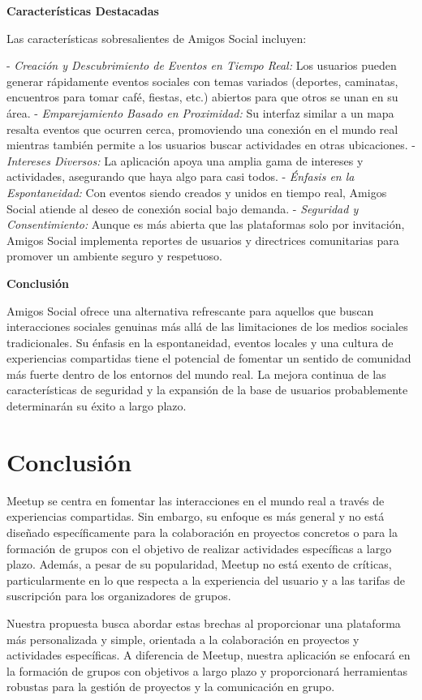 \textbf{Características Destacadas}

Las características sobresalientes de Amigos Social incluyen:

- \textit{Creación y Descubrimiento de Eventos en Tiempo Real:} Los usuarios pueden generar rápidamente eventos sociales con temas variados (deportes, caminatas, encuentros para tomar café, fiestas, etc.) abiertos para que otros se unan en su área.
- \textit{Emparejamiento Basado en Proximidad:} Su interfaz similar a un mapa resalta eventos que ocurren cerca, promoviendo una conexión en el mundo real mientras también permite a los usuarios buscar actividades en otras ubicaciones.
- \textit{Intereses Diversos:} La aplicación apoya una amplia gama de intereses y actividades, asegurando que haya algo para casi todos.
- \textit{Énfasis en la Espontaneidad:} Con eventos siendo creados y unidos en tiempo real, Amigos Social atiende al deseo de conexión social bajo demanda.
- \textit{Seguridad y Consentimiento:} Aunque es más abierta que las plataformas solo por invitación, Amigos Social implementa reportes de usuarios y directrices comunitarias para promover un ambiente seguro y respetuoso.

\textbf{Conclusión}

Amigos Social ofrece una alternativa refrescante para aquellos que buscan interacciones sociales genuinas más allá de las limitaciones de los medios sociales tradicionales. Su énfasis en la espontaneidad, eventos locales y una cultura de experiencias compartidas tiene el potencial de fomentar un sentido de comunidad más fuerte dentro de los entornos del mundo real. La mejora continua de las características de seguridad y la expansión de la base de usuarios probablemente determinarán su éxito a largo plazo.


\section{Conclusión}

Meetup se centra en fomentar las interacciones en el mundo real a 
través de experiencias compartidas. Sin embargo, su enfoque es más 
general y no está diseñado específicamente para la colaboración en 
proyectos concretos o para la formación de grupos con el objetivo de 
realizar actividades específicas a largo plazo. Además, a pesar de su 
popularidad, Meetup no está exento de críticas, particularmente en lo 
que respecta a la experiencia del usuario y a las tarifas de suscripción 
para los organizadores de grupos.

Nuestra propuesta busca abordar estas brechas al proporcionar una 
plataforma más personalizada y simple, orientada a la colaboración en proyectos y 
actividades específicas. A diferencia de Meetup, nuestra aplicación se 
enfocará en la formación de grupos con objetivos a largo plazo y proporcionará 
herramientas robustas para la gestión de proyectos y la comunicación en grupo.